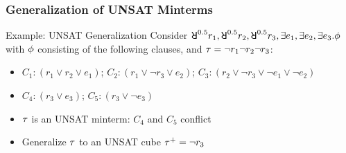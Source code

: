\begin{frame}
    \frametitle{Generalization of UNSAT Minterms}
    \begin{block}{Example: UNSAT Generalization}
        Consider $\random{0.5}r_1,\random{0.5}r_2,\random{0.5}r_3,\exists e_1,\exists e_2,\exists e_3.\pf$ with $\phi$ consisting of the following clauses, and $\tau=\lnot r_1\lnot r_2\lnot r_3$:
        \begin{itemize}
            \item[] $C_1: (r_1 \lor r_2 \lor e_1)$; $C_2: (r_1 \lor \lnot r_3 \lor e_2)$; $C_3: (r_2 \lor \lnot r_3 \lor \lnot e_1 \lor \lnot e_2)$
            \item[] $C_4: (r_3 \lor e_3)$; $C_5: (r_3 \lor \lnot e_3)$
        \end{itemize}
        \begin{itemize}
            \item $\tau$ is an UNSAT minterm: $C_4$ and $C_5$ conflict
            \item Generalize $\tau$ to an UNSAT cube $\tau^+=\lnot r_3$
        \end{itemize}
    \end{block}
\end{frame}